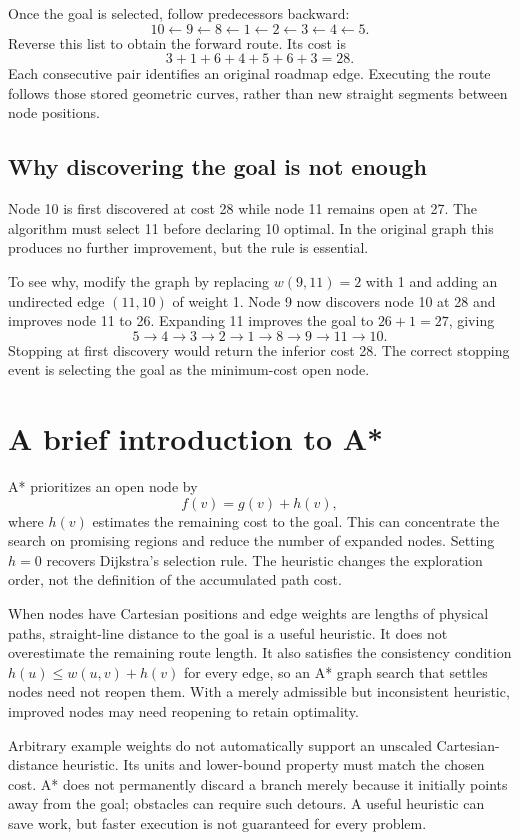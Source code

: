 Once the goal is selected, follow predecessors backward:
\[
 10\leftarrow9\leftarrow8\leftarrow1\leftarrow2\leftarrow3
 \leftarrow4\leftarrow5.
\]
Reverse this list to obtain the forward route. Its cost is
\[
 3+1+6+4+5+6+3=28.
\]
Each consecutive pair identifies an original roadmap edge. Executing the
route follows those stored geometric curves, rather than new straight
segments between node positions.

\subsection{Why discovering the goal is not enough}
Node 10 is first discovered at cost 28 while node 11 remains open at 27.
The algorithm must select 11 before declaring 10 optimal. In the original
graph this produces no further improvement, but the rule is essential.

To see why, modify the graph by replacing $w(9,11)=2$ with 1 and adding
an undirected edge $(11,10)$ of weight 1. Node 9 now discovers node 10 at
28 and improves node 11 to 26. Expanding 11 improves the goal to
$26+1=27$, giving
\[
 5\to4\to3\to2\to1\to8\to9\to11\to10.
\]
Stopping at first discovery would return the inferior cost 28. The correct
stopping event is selecting the goal as the minimum-cost open node.

\section{A brief introduction to A*}
A* prioritizes an open node by
\begin{equation}
 f(v)=g(v)+h(v),
 \label{eq:l13-astar}
\end{equation}
where $h(v)$ estimates the remaining cost to the goal. This can concentrate
the search on promising regions and reduce the number of expanded nodes.
Setting $h=0$ recovers Dijkstra's selection rule. The heuristic changes
the exploration order, not the definition of the accumulated path cost.

When nodes have Cartesian positions and edge weights are lengths of
physical paths, straight-line distance to the goal is a useful heuristic.
It does not overestimate the remaining route length. It also satisfies
the consistency condition $h(u)\le w(u,v)+h(v)$ for every edge, so an
A* graph search that settles nodes need not reopen them. With a merely
admissible but inconsistent heuristic, improved nodes may need reopening
to retain optimality.

Arbitrary example weights do not automatically support an unscaled
Cartesian-distance heuristic. Its units and lower-bound property must
match the chosen cost. A* does not permanently discard a branch merely
because it initially points away from the goal; obstacles can require
such detours. A useful heuristic can save work, but faster execution is
not guaranteed for every problem.

